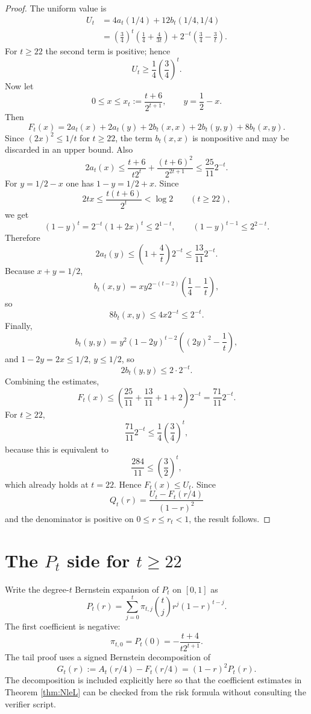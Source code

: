 \documentclass[11pt]{article}
\theoremstyle{definition}
\begin{document}
\begin{proof}
The uniform value is
\[
\begin{aligned}
U_t
&=4a_t(1/4)+12b_t(1/4,1/4)\\
&=\left(\frac34\right)^t\left(\frac14+\frac4{3t}\right)
  +2^{-t}\left(\frac34-\frac3t\right).
\end{aligned}
\]
For $t\ge22$ the second term is positive; hence
\[
  U_t\ge \frac14\left(\frac34\right)^t.
\]
Now let
\[
  0\le x\le x_t:=\frac{t+6}{2^{t+1}},
  \qquad y=\frac12-x.
\]
Then
\[
  F_t(x)=2a_t(x)+2a_t(y)+2b_t(x,x)+2b_t(y,y)+8b_t(x,y).
\]
Since $(2x)^2\le1/t$ for $t\ge22$, the term $b_t(x,x)$ is nonpositive and may be discarded in an upper bound.  Also
\[
  2a_t(x)\le \frac{t+6}{t2^t}+\frac{(t+6)^2}{2^{2t+1}}\le \frac{25}{11}2^{-t}.
\]
For $y=1/2-x$ one has $1-y=1/2+x$.  Since
\[
  2tx\le \frac{t(t+6)}{2^t}<\log2
  \qquad(t\ge22),
\]
we get
\[
  (1-y)^t=2^{-t}(1+2x)^t\le2^{1-t},
  \qquad
  (1-y)^{t-1}\le2^{2-t}.
\]
Therefore
\[
  2a_t(y)\le\left(1+\frac4t\right)2^{-t}\le\frac{13}{11}2^{-t}.
\]
Because $x+y=1/2$,
\[
  b_t(x,y)=xy2^{-(t-2)}\left(\frac14-\frac1t\right),
\]
so
\[
  8b_t(x,y)\le 4x2^{-t}\le2^{-t}.
\]
Finally,
\[
  b_t(y,y)=y^2(1-2y)^{t-2}\left((2y)^2-\frac1t\right),
\]
and $1-2y=2x\le1/2$, $y\le1/2$, so
\[
  2b_t(y,y)\le2\cdot2^{-t}.
\]
Combining the estimates,
\[
  F_t(x)\le \left(\frac{25}{11}+\frac{13}{11}+1+2\right)2^{-t}
  =\frac{71}{11}2^{-t}.
\]
For $t\ge22$,
\[
  \frac{71}{11}2^{-t}\le \frac14\left(\frac34\right)^t,
\]
because this is equivalent to
\[
  \frac{284}{11}\le\left(\frac32\right)^t,
\]
which already holds at $t=22$.  Hence $F_t(x)\le U_t$.  Since
\[
  Q_t(r)=\frac{U_t-F_t(r/4)}{(1-r)^2}
\]
and the denominator is positive on $0\le r\le r_t<1$, the result follows.
\end{proof}

\section{The $P_t$ side for $t\ge22$}

Write the degree-$t$ Bernstein expansion of $P_t$ on $[0,1]$ as
\[
  P_t(r)=\sum_{j=0}^t \pi_{t,j}\binom{t}{j}r^j(1-r)^{t-j}.
\]
The first coefficient is negative:
\[
  \pi_{t,0}=P_t(0)=-\frac{t+4}{t2^{t+1}}.
\]
The tail proof uses a signed Bernstein decomposition of
\[
  G_t(r):=A_t(r/4)-F_t(r/4)=(1-r)^2P_t(r).
\]
The decomposition is included explicitly here so that the coefficient
estimates in Theorem \ref{thm:NleL} can be checked from the risk formula
without consulting the verifier script.
\end{document}
